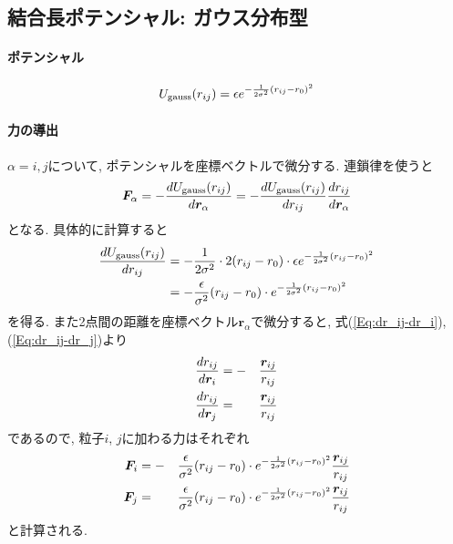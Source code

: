 \subsection{結合長ポテンシャル: ガウス分布型}
\paragraph{ポテンシャル}
\begin{equation}
   U_{\mathrm{gauss}} (r_{ij})
   =
   \epsilon
   e^{-\frac{1}{2\sigma^{2}}(r_{ij} - r_{0})^{2}}
   \notag
\end{equation}

\paragraph{力の導出}
$\alpha = i, j$について, ポテンシャルを座標ベクトルで微分する. 連鎖律を使うと
\begin{equation}
   \bm{F}_{\alpha}
   =
   -
   \frac{d U_{\mathrm{gauss}}(r_{ij})}{d \bm{r}_{\alpha}}
   =
   -
   \frac{d U_{\mathrm{gauss}}(r_{ij})}{d r_{ij}}
   \frac{d r_{ij}}{d \bm{r}_{\alpha}}
   \notag
\end{equation}
となる. 具体的に計算すると
\begin{align}
   \frac{d U_{\mathrm{gauss}}(r_{ij})}{d r_{ij}}
   &=
   -
   \frac{1}{2\sigma^{2}}
   \cdot 2
   (r_{ij} - r_{0})
   \cdot
   \epsilon
   e^{-\frac{1}{2\sigma^{2}}(r_{ij} - r_{0})^{2}}
   \notag
   \\
   &=
   -
   \frac{\epsilon}{\sigma^{2}}
   (r_{ij} - r_{0})
   \cdot
   e^{-\frac{1}{2\sigma^{2}}(r_{ij} - r_{0})^{2}}
   \notag
\end{align}
を得る. また2点間の距離を座標ベクトル$\bm{r}_{\alpha}$で微分すると, 式(\ref{Eq:dr_ij-dr_i}), (\ref{Eq:dr_ij-dr_j})より
\begin{alignat}{3}
   \frac{d r_{ij}}{d \bm{r}_{i}}
   &=
   -&&
   \frac{\bm{r}_{ij}}{r_{ij}}
   \notag
   \\
   \frac{d r_{ij}}{d \bm{r}_{j}}
   &=&&
   \frac{\bm{r}_{ij}}{r_{ij}}
   \notag
\end{alignat}
であるので, 粒子$i$, $j$に加わる力はそれぞれ
\begin{alignat}{3}
   \bm{F}_{i}
   &=
   -&&
   \frac{\epsilon}{\sigma^{2}}
   (r_{ij} - r_{0})
   \cdot
   e^{-\frac{1}{2\sigma^{2}}(r_{ij} - r_{0})^{2}}
   \frac{\bm{r}_{ij}}{r_{ij}}
   \notag \\
   \bm{F}_{j}
   &=&&
   \frac{\epsilon}{\sigma^{2}}
   (r_{ij} - r_{0})
   \cdot
   e^{-\frac{1}{2\sigma^{2}}(r_{ij} - r_{0})^{2}}
   \frac{\bm{r}_{ij}}{r_{ij}}
   \notag
\end{alignat}
と計算される.

